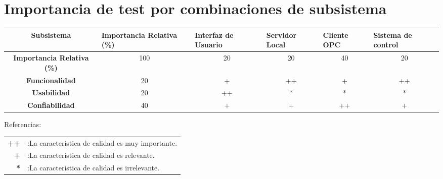 \documentclass[]{scrreprt}
\begin{document}
\chapter{Importancia de test por combinaciones de subsistema}
\begin{table}[h]
\begin{adjustbox}{width=1.2\textwidth}
\begin{tabular}{|c|c|c|c|c|c|}
\hline
\textbf{Subsistema}& \multicolumn{1}{l|}{\textbf{Importancia Relativa (\%)}} & \multicolumn{1}{l|}{\textbf{Interfaz de Usuario}} & \multicolumn{1}{l|}{\textbf{Servidor Local}} & \multicolumn{1}{l|}{\textbf{Cliente OPC}} & \multicolumn{1}{l|}{\textbf{Sistema de control}} \\ \hline
\textbf{Importancia Relativa (\%)} & 100                                                     & 20                                                & 20                                           & 40                                        & 20                                               \\ \hline
\textbf{Funcionalidad}             & 20                                                      & +                                                 & ++                                           & +                                         & ++                                               \\ \hline
\textbf{Usabilidad}                & 20                                                      & ++                                                & *                                            & *                                         & *                                                \\ \hline
\textbf{Confiabilidad}             & 40                                                      & +                                                 & +                                            & ++                                        & +                                                \\ \hline
\end{tabular}
\end{adjustbox}
\end{table}

Referencias:
\begin{table}[h]
\begin{tabular}{rl}
\textbf{++} & :La característica de calidad es muy importante. \\
\textbf{+}  & :La característica de calidad es relevante.      \\
\textbf{*}  & :La característica de calidad es irrelevante.     
\end{tabular}
\end{table}
\end{document}
